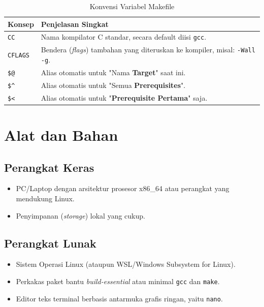 \begin{table}[h]
	\caption{Konvensi Variabel Makefile}
	\label{tab:m06-dasar-teori}
	\centering
	\begin{tabulary}{\textwidth}{|L|L|}
		\hline
		\textbf{Konsep} & \textbf{Penjelasan Singkat} \\ \hline
		\texttt{CC}        & Nama kompilator C standar, secara default diisi \texttt{gcc}. \\ \hline
		\texttt{CFLAGS}    & Bendera (\textit{flags}) tambahan yang diteruskan ke kompiler, misal: \texttt{-Wall -g}. \\ \hline
		\texttt{\$@}       & Alias otomatis untuk "Nama \textbf{Target}" saat ini. \\ \hline
		\texttt{\$\textasciicircum}       & Alias otomatis untuk "Semua \textbf{Prerequisites}". \\ \hline
		\texttt{\$<}       & Alias otomatis untuk "\textbf{Prerequisite Pertama}" saja. \\ \hline
	\end{tabulary}
\end{table}

\newpage
\section{Alat dan Bahan}
\label{sec:m06-alat-bahan}

\subsection{Perangkat Keras}
\begin{itemize}
	\item PC/Laptop dengan arsitektur prosesor x86\_64 atau perangkat yang mendukung Linux.
	\item Penyimpanan (\textit{storage}) lokal yang cukup.
\end{itemize}

\subsection{Perangkat Lunak}
\begin{itemize}
	\item Sistem Operasi Linux (ataupun WSL/Windows Subsystem for Linux).
	\item Perkakas paket bantu \textit{build-essential} atau minimal \texttt{gcc} dan \texttt{make}.
	\item Editor teks terminal berbasis antarmuka grafis ringan, yaitu \texttt{nano}.
\end{itemize}


